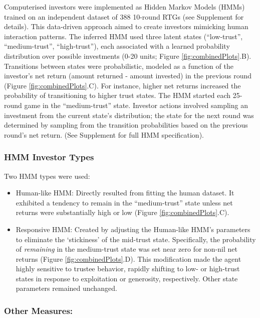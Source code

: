 \documentclass[
]{article}
\providecommand{\tightlist}{%
  \setlength{\itemsep}{0pt}\setlength{\parskip}{0pt}}
\begin{document}
Computerised investors were implemented as Hidden Markov Models (HMMs) trained on an independent dataset of 388 10-round RTGs (see Supplement for details).
This data-driven approach aimed to create investors mimicking human interaction patterns.
The inferred HMM used three latent states (``low-trust'', ``medium-trust'', ``high-trust''), each associated with a learned probability distribution over possible investments (0-20 units; Figure \ref{fig:combinedPlots}.B).
Transitions between states were probabilistic, modeled as a function of the investor's net return (amount returned - amount invested) in the previous round (Figure \ref{fig:combinedPlots}.C).
For instance, higher net returns increased the probability of transitioning to higher trust states.
The HMM started each 25-round game in the ``medium-trust'' state.
Investor actions involved sampling an investment from the current state's distribution; the state for the next round was determined by sampling from the transition probabilities based on the previous round's net return.
(See Supplement for full HMM specification).

\subsubsection{HMM Investor Types}\label{hmm-investor-types}

Two HMM types were used:

\begin{itemize}
\tightlist
\item
  Human-like HMM: Directly resulted from fitting the human dataset. It exhibited a tendency to remain in the ``medium-trust'' state unless net returns were substantially high or low (Figure \ref{fig:combinedPlots}.C).
\item
  Responsive HMM: Created by adjusting the Human-like HMM's parameters to eliminate the `stickiness' of the mid-trust state. Specifically, the probability of \emph{remaining} in the medium-trust state was set near zero for non-nil net returns (Figure \ref{fig:combinedPlots}.D). This modification made the agent highly sensitive to trustee behavior, rapidly shifting to low- or high-trust states in response to exploitation or generosity, respectively. Other state parameters remained unchanged.
\end{itemize}

\subsubsection{Other Measures:}\label{other-measures}
\end{document}
